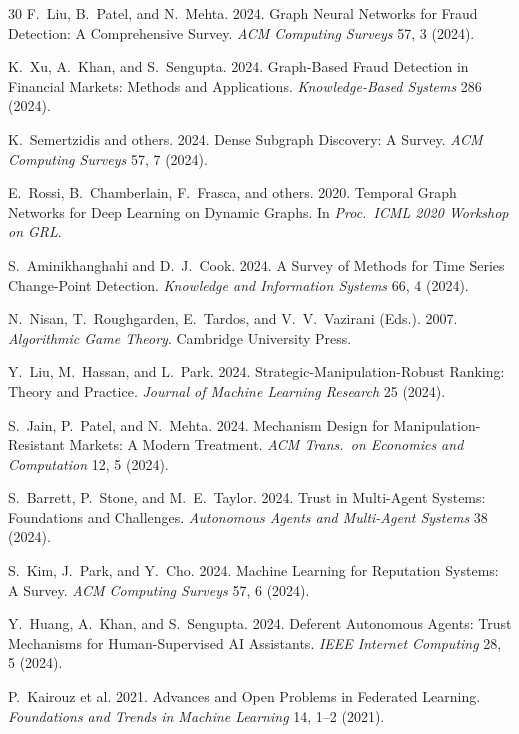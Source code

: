 \documentclass[sigconf,nonacm]{acmart}
\begin{document}
\begin{thebibliography}{30}
F.~Liu, B.~Patel, and N.~Mehta. 2024. Graph Neural Networks for
Fraud Detection: A Comprehensive Survey.
\textit{ACM Computing Surveys} 57, 3 (2024).

K.~Xu, A.~Khan, and S.~Sengupta. 2024. Graph-Based Fraud
Detection in Financial Markets: Methods and Applications.
\textit{Knowledge-Based Systems} 286 (2024).

K.~Semertzidis and others. 2024. Dense Subgraph Discovery: A
Survey. \textit{ACM Computing Surveys} 57, 7 (2024).

E.~Rossi, B.~Chamberlain, F.~Frasca, and others. 2020. Temporal
Graph Networks for Deep Learning on Dynamic Graphs.
In \textit{Proc.\ ICML 2020 Workshop on GRL}.

S.~Aminikhanghahi and D.~J.~Cook. 2024. A Survey of Methods for
Time Series Change-Point Detection.
\textit{Knowledge and Information Systems} 66, 4 (2024).

N.~Nisan, T.~Roughgarden, E.~Tardos, and V.~V.~Vazirani (Eds.).
2007. \textit{Algorithmic Game Theory}. Cambridge University Press.

Y.~Liu, M.~Hassan, and L.~Park. 2024. Strategic-Manipulation-Robust
Ranking: Theory and Practice. \textit{Journal of Machine Learning
Research} 25 (2024).

S.~Jain, P.~Patel, and N.~Mehta. 2024. Mechanism Design for
Manipulation-Resistant Markets: A Modern Treatment.
\textit{ACM Trans.\ on Economics and Computation} 12, 5 (2024).

S.~Barrett, P.~Stone, and M.~E.~Taylor. 2024. Trust in
Multi-Agent Systems: Foundations and Challenges.
\textit{Autonomous Agents and Multi-Agent Systems} 38 (2024).

S.~Kim, J.~Park, and Y.~Cho. 2024. Machine Learning for Reputation
Systems: A Survey. \textit{ACM Computing Surveys} 57, 6 (2024).

Y.~Huang, A.~Khan, and S.~Sengupta. 2024. Deferent Autonomous
Agents: Trust Mechanisms for Human-Supervised AI Assistants.
\textit{IEEE Internet Computing} 28, 5 (2024).

P.~Kairouz et al. 2021. Advances and Open Problems in Federated
Learning. \textit{Foundations and Trends in Machine Learning} 14,
1--2 (2021).


\end{thebibliography}
\end{document}
